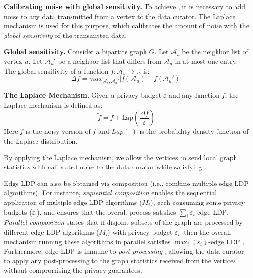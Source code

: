 \noindent
{\bf Calibrating noise with global sensitivity. }
To achieve \epldp, it is necessary to add noise to any data transmitted from a vertex to the data curator. The Laplace mechanism is used for this purpose, which calibrates the amount of noise with the {\em global sensitivity} of the transmitted data. 

\begin{definition}
\label{def:gs}
{\bf Global sensitivity.} 
Consider a bipartite graph $G$. 
Let $\mathcal{A}_u$ be the neighbor list of vertex $u$. 
Let $\mathcal{A}_u'$ be a neighbor list that differs from $\mathcal{A}_u$ in at most one entry. 
The global sensitivity of a function $f: \mathcal{A}_u \rightarrow \mathbb{R}$ is:
$$
\Delta f = max_{\mathcal{A}_u , \mathcal{A}_u'} | f(\mathcal{A}_u) - f(\mathcal{A}_u') |
$$
\end{definition}
\begin{definition}
\label{def:lap}
{\bf The Laplace Mechanism.} 
Given a privacy budget $\varepsilon$ and any function $f$, the Laplace mechanism is defined as:
$$
\tilde{f} = f + \text{Lap}\left(\frac{\Delta f}{\varepsilon}\right)
$$
Here $\tilde{f}$ is the noisy version of $f$ and $Lap(\cdot)$ is the probability density function of the Laplace distribution. 
\end{definition}
By applying the Laplace mechanism, we allow the vertices to send local graph statistics with calibrated noise to the data curator while satisfying \epldp. 



{\color{black}
Edge LDP can also be obtained via composition (i.e., combine multiple edge LDP algorithms). 
For instance, {\em sequential composition} \cite{jiang2021applications, qin_generating_2017} enables the sequential application of multiple edge LDP algorithms ($M_i$), each consuming some privacy budgets ($\varepsilon_i$), and ensures that the overall process satisfies $\sum_{i} \varepsilon_i$-edge LDP. 
{\em Parallel composition} states that if disjoint subsets of the graph are processed by different edge LDP algorithms ($M_i$) with privacy budget $\varepsilon_i$, then the overall mechanism running these algorithms in parallel satisfies $\max_i(\varepsilon_i)$-edge LDP \cite{yang2023local}.
Furthermore, edge LDP is immune to {\em post-processing} \cite{yang2023local, imola2021locally}, allowing the data curator to apply any post-processing to the graph statistics received from the vertices without compromising the privacy guarantees. }



